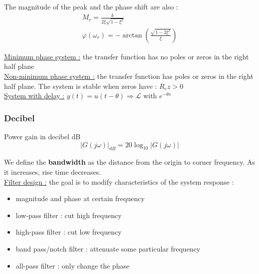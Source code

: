 \documentclass[../main.tex]{subfiles}
\begin{document}
The magnitude of the peak and the phase shift are also : \begin{equation}
    \begin{gathered}
        M_r = \frac{k}{2\xi \sqrt{1-\xi^2}}\\
        \varphi(\omega_r) = -\arctan(\frac{\sqrt{1-2\xi^2}}{\xi})
    \end{gathered}
\end{equation}

\quad \underline{Minimum phase system :} the transfer function has no poles or zeros in the right half plane\\

\quad \underline{Non-minimum phase system :} the transfer function has poles or zeros in the right half plane. The system is stable when zeros have : $R_e z >0$\\

\quad \underline{System with delay :} $y(t) = u(t-\theta) \Rightarrow \mathcal{L}$ with $e^{-\theta s}$\\

\subsubsection{Decibel}
Power gain in decibel dB\\
\begin{equation}
    \lvert G(j\omega) \rvert_{dB} = 20 \log_{10}\lvert G(j\omega)\rvert
\end{equation}

We define the \textbf{bandwidth} as the distance from the origin to corner frequency. As it increases, rise time decreases.\\

\quad \underline{Filter design :} the goal is to modify characteristics of the system response :\begin{itemize}
    \item magnitude and phase at certain frequency\\
    \item low-pass filter : cut high frequency\\
    \item high-pass filter : cut low frequency\\
    \item band pass/notch filter : attenuate some particular frequency\\
    \item all-pass filter : only change the phase\\
\end{itemize}
\end{document}
